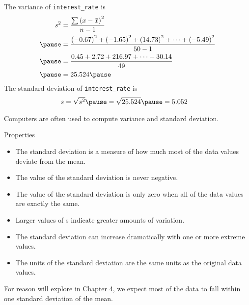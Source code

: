 \documentclass{beamer}
\begin{document}
\begin{frame}
\begin{example}
The variance of \texttt{interest\_rate} is
\begin{equation*}
\begin{aligned}
s^2 &= \dfrac{\sum {\left(x-\bar{x}\right)}^2}{n-1}\\\pause
&=  \dfrac{{(-0.67)}^2+{(-1.65)}^2+{(14.73)}^2+\cdots+{(-5.49)}^2}{50-1}  \\\pause
&= \dfrac{0.45+2.72+216.97+\cdots+30.14}{49} \\\pause
&= 25.524\pause
\end{aligned}
\end{equation*}
The standard deviation of \texttt{interest\_rate} is
\begin{equation*}
\begin{aligned}
s &= \sqrt{s^2} \pause = \sqrt{25.524} \pause = 5.052
\end{aligned}
\end{equation*}
\end{example}\pause
\begin{note}
Computers are often used to compute variance and standard deviation.
\end{note}
\end{frame}

\begin{frame}
\begin{block}{Properties}
\begin{itemize}[<+- | alert@+>]
\item The standard deviation is a measure of how much most of the data values deviate from the mean.
\item The value of the standard deviation is never negative.
\item The value of the standard deviation is only zero when all of the data values are exactly the same.
\item Larger values of s indicate greater amounts of variation.
\item The standard deviation can increase dramatically with one or more extreme values.
\item The units of the standard deviation are the same units as the original data values.
\end{itemize}
\end{block}
\onslide<+->
\begin{note}
For reason will explore in Chapter 4, we expect most of the data to fall within one standard deviation of the mean.
\end{note}
\end{frame}
\end{document}
